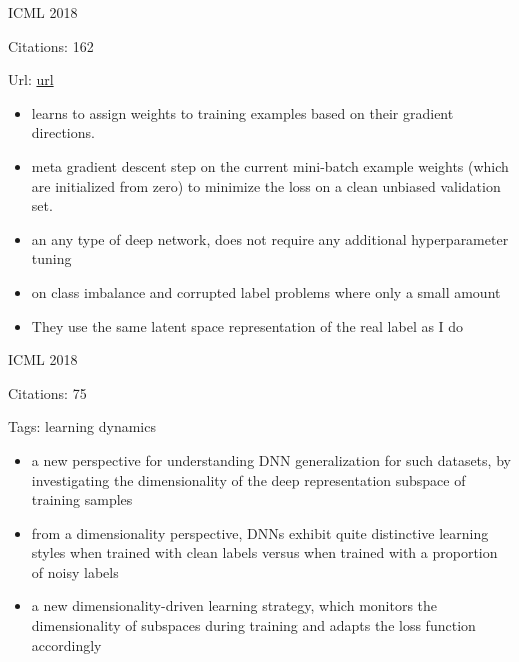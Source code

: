 \documentclass[11pt]{article}
\begin{document}
\vspace{2cm}

\noindent ICML 2018

\noindent Citations: 162

\noindent Url: \href{https://arxiv.org/pdf/1803.09050.pdf}{url}

\begin{itemize}
  \item learns to assign weights to training examples based on their gradient directions.
  \item meta gradient descent step on the current mini-batch example weights (which are initialized from zero) to minimize the loss on a clean unbiased validation set.
  \item an any type of deep network, does not require any additional hyperparameter tuning
  \item on class imbalance and corrupted label problems where only a small amount 
\end{itemize}

\begin{itemize}
\item They use the same latent space representation of the real label as I do
\end{itemize}

\vspace{2cm}

\noindent ICML 2018

\noindent Citations: 75

\noindent Tags: learning dynamics

\begin{itemize}
\item a new perspective for understanding DNN generalization for such datasets, by investigating the dimensionality of the deep representation subspace of training samples
\item from a dimensionality perspective, DNNs exhibit quite distinctive learning styles when trained with clean labels versus when trained with a proportion of noisy labels
\item a new dimensionality-driven learning strategy, which monitors the dimensionality of subspaces during training and adapts the loss function accordingly
\end{itemize}

\vspace{2cm}
\end{document}
